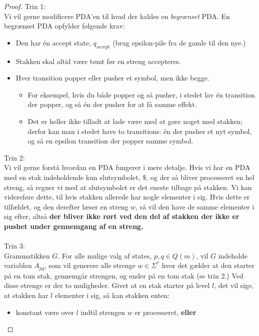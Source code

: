 \begin{proof}
  Trin 1:\\
  \noindent
  Vi vil gerne modificere PDA'en til hvad der kaldes en \textit{begrænset} PDA. En begrænset PDA opfylder følgende krav:
  \begin{itemize}
    \item Den har én accept state, $q_{\text{accept}}$ (brug epsilon-pile fra de gamle til den nye.)
    \item Stakken skal altid være tømt før en streng accepteres.
    \item Hver transition popper eller pusher et symbol, men ikke begge.
          \begin{itemize}
            \item For eksempel, hvis du både popper og så pusher, i stedet lav én transition der popper, og så én der pusher for at få samme effekt.
            \item Det er heller ikke tilladt at lade være med at gøre noget med stakken; derfor kan man i stedet have to transitions: én der pusher et nyt symbol, og så en epsilon transition der popper samme symbol.
          \end{itemize}
  \end{itemize}
  Trin 2:\\
  \noindent
  Vi vil gerne forstå hvordan en PDA fungerer i mere detalje. Hvis vi har en PDA med en stak indeholdende kun slutsymbolet, $\$$, og der så bliver processeret en hel streng, så regner vi med at slutsymbolet er det eneste tilbage på stakken. Vi kan videreføre dette, til hvis stakken allerede har nogle elementer i sig. Hvis dette er tilfældet, og den derefter læser en streng $w$, så vil den have de samme elementer i sig efter, altså \textbf{der bliver ikke rørt ved den del af stakken der ikke er pushet under gennemgang af en streng.}\\\\
  \noindent
  Trin 3:\\
  \noindent
  Grammatikken $G$. For alle mulige valg af states, $p, q \in Q(m)$, vil $G$ indeholde variablen $A_{pq}$, som vil generere alle strenge $w \in \Sigma^*$ hvor det gælder at den starter på en tom stak, gennemgår strengen, og ender på en tom stak (se trin 2.) Ved disse strenge er der to muligheder. Givet at en stak starter på level $l$, det vil sige, at stakken har $l$ elementer i sig, så kan stakken enten:
  \begin{itemize}
    \item konstant være over $l$ indtil strengen $w$ er processeret, \textbf{eller}

\end{itemize}
\end{proof}
